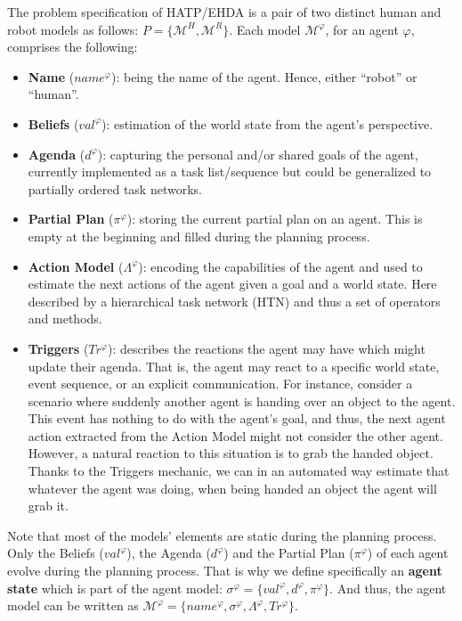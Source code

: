 The problem specification of HATP/EHDA is a pair of two distinct human and robot models as follows: $P = \{ \mathcal{M}^H, \mathcal{M}^R \}$. Each model $\mathcal{M}^\varphi$, for an agent $\varphi$, comprises the following:
\begin{itemize}
    \item \textbf{Name} ($name^{\varphi}$): being the name of the agent. Hence, either ``robot'' or ``human''.
    
    \item \textbf{Beliefs} ($val^{\varphi}$): estimation of the world state from the agent's perspective.
    
    \item \textbf{Agenda} ($d^{\varphi}$): capturing the personal and/or shared goals of the agent, currently implemented as a task list/sequence but could be generalized to partially ordered task networks.
    
    \item \textbf{Partial Plan} ($\pi^{\varphi}$): storing the current partial plan on an agent. This is empty at the beginning and filled during the planning process.
    
    \item \textbf{Action Model} ($\Lambda^{\varphi}$): encoding the capabilities of the agent and used to estimate the next actions of the agent given a goal and a world state. Here described by a hierarchical task network (HTN) and thus a set of operators and methods. 
    
    \item \textbf{Triggers} ($Tr^{\varphi}$): describes the reactions the agent may have which might update their agenda. That is, the agent may react to a specific world state, event sequence, or an explicit communication. For instance,  consider a scenario where suddenly another agent is handing over an object to the agent. This event has nothing to do with the agent's goal, and thus, the next agent action extracted from the Action Model might not consider the other agent. However, a natural reaction to this situation is to grab the handed object. Thanks to the Triggers mechanic, we can in an automated way estimate that whatever the agent was doing, when being handed an object the agent will grab it.  
\end{itemize}

Note that most of the models' elements are static during the planning process. Only the Beliefs ($val^{\varphi}$), the Agenda ($d^{\varphi}$) and the Partial Plan ($\pi^{\varphi}$) of each agent evolve during the planning process. That is why we define specifically an \textbf{agent state} which is part of the agent model:
$\sigma^{\varphi} = \{ val^{\varphi}, d^{\varphi}, \pi^{\varphi} \}$. 
And thus, the agent model can be written as $\mathcal{M}^{\varphi} = \{ name^{\varphi}, \sigma^{\varphi}, \Lambda^{\varphi}, Tr^{\varphi} \}$.


